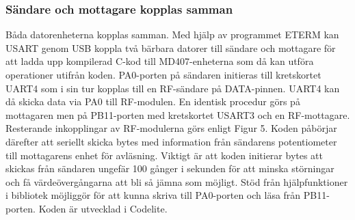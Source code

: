 \documentclass[a4paper]{article}
\begin{document}
\subsubsection{Sändare och mottagare kopplas samman}
Båda datorenheterna kopplas samman. Med hjälp av programmet ETERM kan USART genom USB koppla två bärbara datorer till sändare och mottagare för att ladda upp kompilerad C-kod till MD407-enheterna som då kan utföra operationer utifrån koden. PA0-porten på sändaren initieras till kretskortet UART4 som i sin tur kopplas till en RF-sändare på DATA-pinnen. UART4 kan då skicka data via PA0 till RF-modulen. En identisk procedur görs på mottagaren men på PB11-porten med kretskortet USART3 och en RF-mottagare. Resterande inkopplingar av RF-modulerna görs enligt Figur 5. Koden påbörjar därefter att seriellt skicka bytes med information från sändarens potentiometer till mottagarens enhet för avläsning. Viktigt är att koden initierar bytes att skickas från sändaren ungefär 100 gånger i sekunden för att minska störningar och få värdeövergångarna att bli så jämna som möjligt. Stöd från hjälpfunktioner i bibliotek möjliggör för att kunna skriva till PA0-porten och läsa från PB11-porten. Koden är utvecklad i Codelite.
\end{document}
